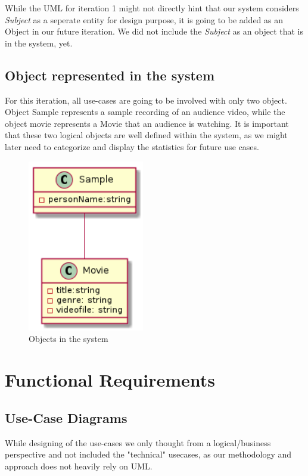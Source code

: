 \documentclass[12pt,a4paper,man]{report}
\begin{document}
While the UML for iteration 1 might not directly hint that our system considers \emph{Subject} as a seperate entity for design purpose, it is going to be added as an Object in our future iteration. We did not include the \emph{Subject} as an object that is in the system, yet. 


\section{Object represented in the system}
\label{sec:org65d8299}
For this iteration, all use-cases are going to be involved with only two object. Object Sample represents a sample recording of an audience video, while the object movie represents a Movie that an audience is watching. It is important that these two logical objects are well defined within the system, as we might later need to categorize and display the statistics for future use cases.
\begin{figure}[htbp]
\centering
\includegraphics[width=2in]{./img/obj1.png}
\caption{\label{fig:gantt1}
Objects in the system}
\end{figure}


\chapter{Functional Requirements}
\label{sec:orga43a564}
\section{Use-Case Diagrams}
\label{sec:org3b071be}
While designing of the use-cases we only thought from a logical/business perspective and not included the "technical" usecases, as our methodology and approach does not heavily rely on UML. 
\end{document}
